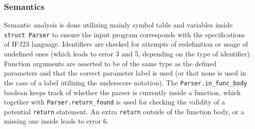 \subsubsection{Semantics}
\label{parser:analysis:semantics}
Semantic analysis is done utilizing mainly symbol table and variables inside \texttt{struct Parser} to ensure the input program corresponds with the specifications of IFJ23 language. Identifiers are checked for attempts of redefinition or usage of undefined ones (which leads to error 3 and 5, depending on the type of identifier). Function arguments are asserted to be of the same type as the defined parameters and that the correct parameter label is used (or that none is used in the case of a label utilizing the underscore notation). The \texttt{Parser.in\_func\_body} boolean keeps track of whether the parser is currently inside a function, which together with \texttt{Parser.return\_found} is used for checking the validity of a potential \texttt{return} statement. An extra \texttt{return} outside of the function body, or a missing one inside leads to error 6.